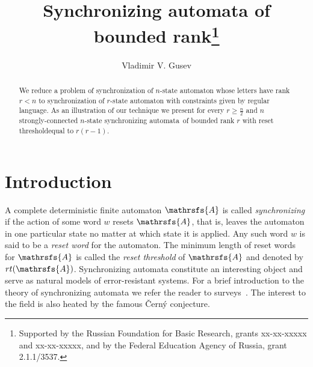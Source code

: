 \documentclass[11pt]{llncs}
\newcommand{\sa}{synchronizing automata}
\newcommand{\rl}{reset threshold}
\newcommand{\rt}{rt}
\begin{document}
\title{Synchronizing automata of bounded rank\thanks{Supported
by the Russian Foundation for Basic Research, grants xx-xx-xxxxx
and xx-xx-xxxxx, and by the Federal Education Agency of Russia,
grant 2.1.1/3537.}}


\author{Vladimir V. Gusev}




\maketitle

\begin{abstract}
We reduce a problem of synchronization of $n$-state automaton
whose letters have rank $r < n$ to synchronization of $r$-state 
automaton with constraints given by regular language.
As an illustration of our technique we present for every 
$r \geq \frac{n}{2}$ and $n$ strongly-connected $n$-state \sa\
of bounded rank $r$ with \rl equal to $r(r - 1)$.
\end{abstract}

\section{Introduction}
A complete deterministic finite automaton $\mathrsfs{A}$ is called
\emph{synchronizing} if the action of some word $w$ resets $\mathrsfs{A}$, that
is, leaves the automaton in one particular state no matter at which state it is
applied. Any such word $w$ is said to be a \emph{reset word} for the automaton.
The minimum length of reset words for $\mathrsfs{A}$ is called the \emph{\rl}
of $\mathrsfs{A}$ and denoted by $\rt(\mathrsfs{A})$. Synchronizing automata
constitute an interesting object and serve as natural models of error-resistant
systems. For a brief introduction to the theory of synchronizing automata we refer
the reader to surveys~\cite{Sa05,Vo08}. 
The interest to the field is
also heated by the famous \v{C}ern\'{y} conjecture.
\end{document}
